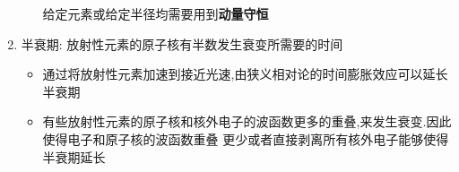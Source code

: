 \documentclass{article}
\begin{document}
\begin{enumerate}
\begin{itemize}
                  \hspace*{5em}给定元素或给定半径均需要用到\textbf{动量守恒}
          \end{itemize}

          \vspace*{2em}

    \item 半衰期: 放射性元素的原子核有半数发生衰变所需要的时间\vspace{-1em}

          \hspace{-0.9em}\begin{adjustbox}{minipage=0.91\linewidth, bgcolor=gray!20, padding=1em}
              \small %
              \begin{itemize}
                  \item 通过将放射性元素加速到接近光速,由狭义相对论的时间膨胀效应可以延长半衰期
                  \item 有些放射性元素的原子核和核外电子的波函数更多的重叠,来发生衰变.因此使得电子和原子核的波函数重叠
                        更少或者直接剥离所有核外电子能够使得半衰期延长
              \end{itemize}
          \end{adjustbox}

          \vspace{-1em}

          \vspace*{2em}


\end{enumerate}
\end{document}
